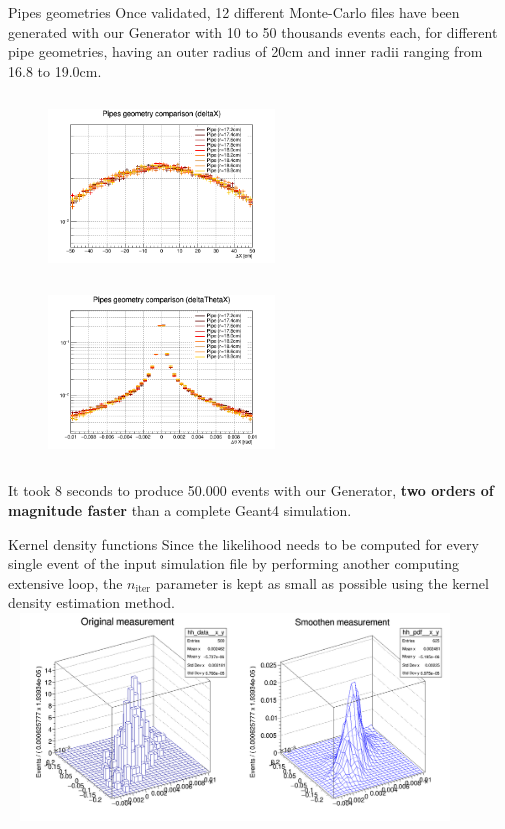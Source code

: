 \documentclass[8 pt]{beamer}
\begin{document}
\begin{frame}{Pipes geometries}
\justifying
Once validated, 12 different Monte-Carlo files have been generated with our Generator with 10 to 50 thousands events each, for different pipe geometries, having an outer radius of 20cm and inner radii ranging from 16.8 to 19.0cm. \vfill

\begin{figure}[htbp]
\centering
\begin{minipage}[b]{.49\textwidth}
\includegraphics[width=6cm, height=4.8cm]{figs/deltaX.png}
\end{minipage}\hfill
\begin{minipage}[b]{.49\textwidth}
\includegraphics[width=6cm, height=4.8cm]{figs/deltaThetaX.png}
\end{minipage}\hfill
\label{fig:gemComp}
\end{figure} \vfill

It took 8 seconds to produce 50.000 events with our Generator, \textbf{two orders of magnitude faster} than a complete Geant4 simulation. \vfill
\end{frame}

\begin{frame}{Kernel density functions}
\justifying
Since the likelihood needs to be computed for every single event of the input simulation file by performing another computing extensive loop, the $n_{\text{iter}}$ parameter is kept as small as possible using the kernel density estimation method. \vfill
\includegraphics[width=12cm, height=5.5cm]{figs/plot_kernelx.png} \vfill
\end{frame}
\end{document}
